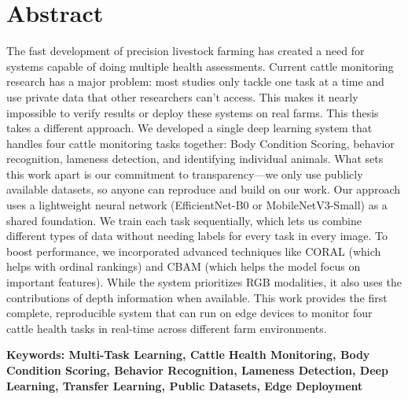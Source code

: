 \section*{Abstract}

The fast development of precision livestock farming has created a need for systems capable of doing multiple health assessments. Current cattle monitoring research has a major problem: most studies only tackle one task at a time and use private data that other researchers can't access. This makes it nearly impossible to verify results or deploy these systems on real farms. This thesis takes a different approach. We developed a single deep learning system that handles four cattle monitoring tasks together: Body Condition Scoring, behavior recognition, lameness detection, and identifying individual animals. What sets this work apart is our commitment to transparency—we only use publicly available datasets, so anyone can reproduce and build on our work. Our approach uses a lightweight neural network (EfficientNet-B0 or MobileNetV3-Small) as a shared foundation. We train each task sequentially, which lets us combine different types of data without needing labels for every task in every image. To boost performance, we incorporated advanced techniques like CORAL (which helps with ordinal rankings) and CBAM (which helps the model focus on important features). While the system prioritizes RGB modalities, it also uses the contributions of depth information when available. This work provides the first complete, reproducible system that can run on edge devices to monitor four cattle health tasks in real-time across different farm environments.

\vspace{1cm}
\noindent \textbf{Keywords: Multi-Task Learning, Cattle Health Monitoring, Body Condition Scoring, Behavior Recognition, Lameness Detection, Deep Learning, Transfer Learning, Public Datasets, Edge Deployment}
\pagebreak